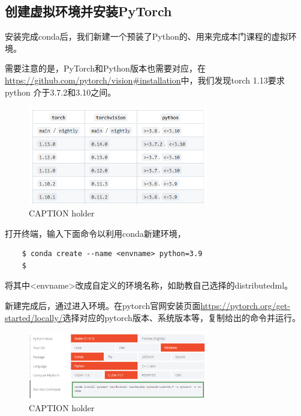 \subsection{创建虚拟环境并安装PyTorch}

安装完成conda后，我们新建一个预装了Python的、用来完成本门课程的虚拟环境。

需要注意的是，PyTorch和Python版本也需要对应，在\url{https://github.com/pytorch/vision#installation}中，我们发现torch 1.13要求python 介于3.7.2和3.10之间。

\begin{figure}[htbp]
	\centering
	\includegraphics[width=0.7\textwidth]{figures/pytorch-python-version-compability.png}
	\caption{CAPTION holder}
	\label{LABEL holder}
\end{figure}

打开终端，输入下面命令以利用conda新建环境，
\begin{lstlisting}
    $ conda create --name <envname> python=3.9
    $ 
\end{lstlisting}
将其中<envname>改成自定义的环境名称，如助教自己选择的distributedml。

新建完成后，通过进入环境。在pytorch官网安装页面\url{https://pytorch.org/get-started/locally/}选择对应的pytorch版本、系统版本等，复制给出的命令并运行。

\begin{figure}[htbp]
	\centering
	\includegraphics[width=0.7\textwidth]{figures/pytorch-install-command.png}
	\caption{CAPTION holder}
	\label{fig:pytorch-install-command}
\end{figure}

